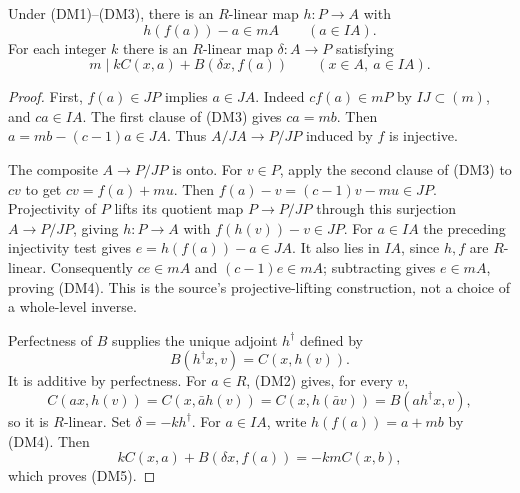 \begin{lemma}
\label{lem:ftb-dual-half-inverse}
Under (DM1)--(DM3), there is an \(R\)-linear map \(h:P\to A\)
with
\[
                    h(f(a))-a\in mA\qquad(a\in IA).
                                                               \tag{DM4}
\]
For each integer \(k\) there is an \(R\)-linear map
\(\delta:A\to P\) satisfying
\[
          m\mid kC(x,a)+B(\delta x,f(a))
                         \qquad(x\in A,\ a\in IA).        \tag{DM5}
\]
\end{lemma}
\begin{proof}
First, \(f(a)\in JP\) implies \(a\in JA\).
Indeed \(cf(a)\in mP\) by \(IJ\subset(m)\), and \(ca\in IA\).
The first clause of (DM3) gives \(ca=mb\).
Then \(a=mb-(c-1)a\in JA\).
Thus \(A/JA\to P/JP\) induced by \(f\) is injective.

The composite \(A\to P/JP\) is onto.
For \(v\in P\), apply the second clause of (DM3) to \(cv\)
to get \(cv=f(a)+mu\).
Then \(f(a)-v=(c-1)v-mu\in JP\).
Projectivity of \(P\) lifts its quotient map \(P\to P/JP\)
through this surjection \(A\to P/JP\), giving \(h:P\to A\)
with \(f(h(v))-v\in JP\).
For \(a\in IA\) the preceding injectivity test gives
\(e=h(f(a))-a\in JA\).
It also lies in \(IA\), since \(h,f\) are \(R\)-linear.
Consequently \(ce\in mA\) and \((c-1)e\in mA\);
subtracting gives \(e\in mA\), proving (DM4).
This is the source's projective-lifting construction, not
a choice of a whole-level inverse.

Perfectness of \(B\) supplies the unique adjoint \(h^\dagger\)
defined by
\[
                  B(h^\dagger x,v)=C(x,h(v)).
\]
It is additive by perfectness.
For \(a\in R\), (DM2) gives, for every \(v\),
\[
 C(ax,h(v))=C(x,\bar a h(v))
           =C(x,h(\bar a v))
           =B(a h^\dagger x,v),
\]
so it is \(R\)-linear.
Set \(\delta=-k h^\dagger\).
For \(a\in IA\), write \(h(f(a))=a+mb\) by (DM4).
Then
\[
 kC(x,a)+B(\delta x,f(a))=-kmC(x,b),
\]
which proves (DM5).
\end{proof}

